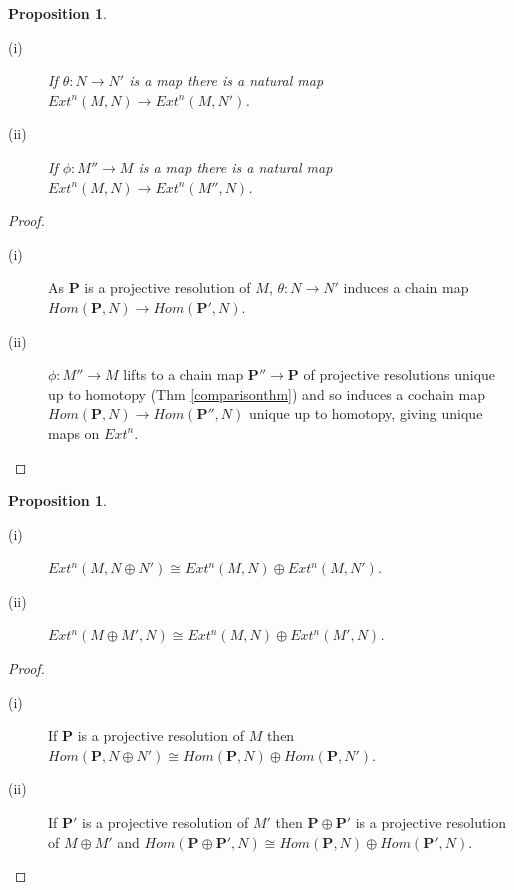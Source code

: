 \documentclass[11.5pt, twoside, a4paper, titlepage]{report}
\theoremstyle{definition}
\theoremstyle{plain}
\newtheorem{prop}[mydef]{Proposition}
\begin{document}
\begin{prop}
\begin{description}
\item [(i)] If $\theta: N \to N'$ is a map there is a natural map $ Ext^n(M, N) \to Ext^n(M, N')$.
\item[(ii)] If $\phi: M'' \to M$ is a map there is a natural map $ Ext^n(M, N) \to Ext^n(M'', N)$.
\end{description}
\end{prop}
\begin{proof}
\begin{description}
\item [(i)] As $\mathbf{P}$ is a projective resolution of $M$, $\theta: N \to N'$ induces a chain map $Hom(\mathbf{P}, N) \to Hom(\mathbf{P'}, N)$.
\item [(ii)] $\phi: M'' \to M$ lifts to a chain map $\mathbf{P''} \to \mathbf{P}$ of projective resolutions unique up to homotopy (Thm \ref{comparisonthm}) and so induces a cochain map $Hom(\mathbf{P}, N) \to Hom(\mathbf{P''}, N)$ unique up to homotopy, giving unique maps on $Ext^n$.
\end{description}
\end{proof}

\begin{prop}
\begin{description}
\item [(i)] $Ext^n(M, N\oplus N') \cong Ext^n(M, N) \oplus Ext^n(M, N')$.
\item [(ii)] $Ext^n(M\oplus M', N) \cong Ext^n(M, N) \oplus Ext^n(M', N)$.
\end{description}
\end{prop}
\begin{proof}
\begin{description}
\item [(i)] If $\mathbf{P}$ is a projective resolution of $M$ then $Hom(\mathbf{P}, N\oplus N')\cong Hom(\mathbf{P}, N) \oplus Hom(\mathbf{P}, N')$.
\item [(ii)] If $\mathbf{P'}$ is a projective resolution of $M'$ then $\mathbf{P} \oplus \mathbf{P'}$ is a projective resolution of $M\oplus M'$ and $Hom(\mathbf{P} \oplus \mathbf{P'}, N) \cong Hom(\mathbf{P}, N) \oplus Hom(\mathbf{P'}, N)$.
\end{description}
\end{proof}
\end{document}

